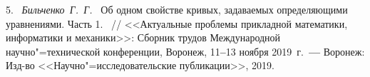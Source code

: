 5.~%
\textit%
{Бильченко~Г.~Г.~}
{%
  {Об одном свойстве кривых,
  задаваемых
  определяющими уравнениями.
  Часть 1.}%
~/$\!$/
  <<Актуальные проблемы
  прикладной математики, информатики
  и механики>>:
  Сборник трудов Международной
  научно"=технической
  конференции,
  Воронеж,
  11{\textbf{--}}13
  ноября 2019~г.~{\textbf{---}}
  Воронеж:
  Изд-во
  <<Научно"=исследовательские
  публикации>>,
  2019.%
  }


